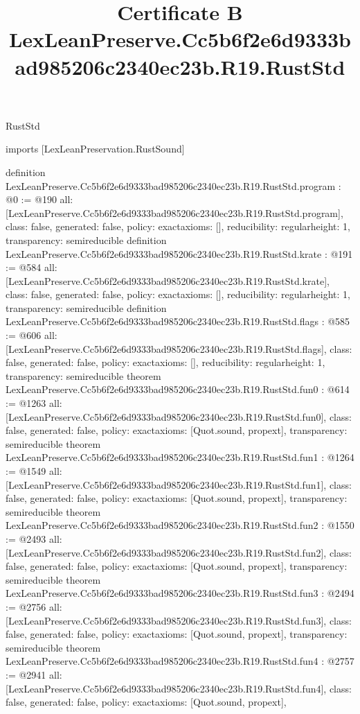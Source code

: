 \begin{lexlean}{RustStd}
\title{Certificate B LexLeanPreserve.Cc5b6f2e6d9333bad985206c2340ec23b.R19.RustStd}
\begin{coremodule}
imports [LexLeanPreservation.RustSound]

definition LexLeanPreserve.Cc5b6f2e6d9333bad985206c2340ec23b.R19.RustStd.program : @0 := @190 {
  all: [LexLeanPreserve.Cc5b6f2e6d9333bad985206c2340ec23b.R19.RustStd.program],
  class: false,
  generated: false,
  policy: exact{axioms: []},
  reducibility: regular{height: 1},
  transparency: semireducible
}
definition LexLeanPreserve.Cc5b6f2e6d9333bad985206c2340ec23b.R19.RustStd.krate : @191 := @584 {
  all: [LexLeanPreserve.Cc5b6f2e6d9333bad985206c2340ec23b.R19.RustStd.krate],
  class: false,
  generated: false,
  policy: exact{axioms: []},
  reducibility: regular{height: 1},
  transparency: semireducible
}
definition LexLeanPreserve.Cc5b6f2e6d9333bad985206c2340ec23b.R19.RustStd.flags : @585 := @606 {
  all: [LexLeanPreserve.Cc5b6f2e6d9333bad985206c2340ec23b.R19.RustStd.flags],
  class: false,
  generated: false,
  policy: exact{axioms: []},
  reducibility: regular{height: 1},
  transparency: semireducible
}
theorem LexLeanPreserve.Cc5b6f2e6d9333bad985206c2340ec23b.R19.RustStd.fun0 : @614 := @1263 {
  all: [LexLeanPreserve.Cc5b6f2e6d9333bad985206c2340ec23b.R19.RustStd.fun0],
  class: false,
  generated: false,
  policy: exact{axioms: [Quot.sound, propext]},
  transparency: semireducible
}
theorem LexLeanPreserve.Cc5b6f2e6d9333bad985206c2340ec23b.R19.RustStd.fun1 : @1264 := @1549 {
  all: [LexLeanPreserve.Cc5b6f2e6d9333bad985206c2340ec23b.R19.RustStd.fun1],
  class: false,
  generated: false,
  policy: exact{axioms: [Quot.sound, propext]},
  transparency: semireducible
}
theorem LexLeanPreserve.Cc5b6f2e6d9333bad985206c2340ec23b.R19.RustStd.fun2 : @1550 := @2493 {
  all: [LexLeanPreserve.Cc5b6f2e6d9333bad985206c2340ec23b.R19.RustStd.fun2],
  class: false,
  generated: false,
  policy: exact{axioms: [Quot.sound, propext]},
  transparency: semireducible
}
theorem LexLeanPreserve.Cc5b6f2e6d9333bad985206c2340ec23b.R19.RustStd.fun3 : @2494 := @2756 {
  all: [LexLeanPreserve.Cc5b6f2e6d9333bad985206c2340ec23b.R19.RustStd.fun3],
  class: false,
  generated: false,
  policy: exact{axioms: [Quot.sound, propext]},
  transparency: semireducible
}
theorem LexLeanPreserve.Cc5b6f2e6d9333bad985206c2340ec23b.R19.RustStd.fun4 : @2757 := @2941 {
  all: [LexLeanPreserve.Cc5b6f2e6d9333bad985206c2340ec23b.R19.RustStd.fun4],
  class: false,
  generated: false,
  policy: exact{axioms: [Quot.sound, propext]},
}
\end{coremodule}
\end{lexlean}
